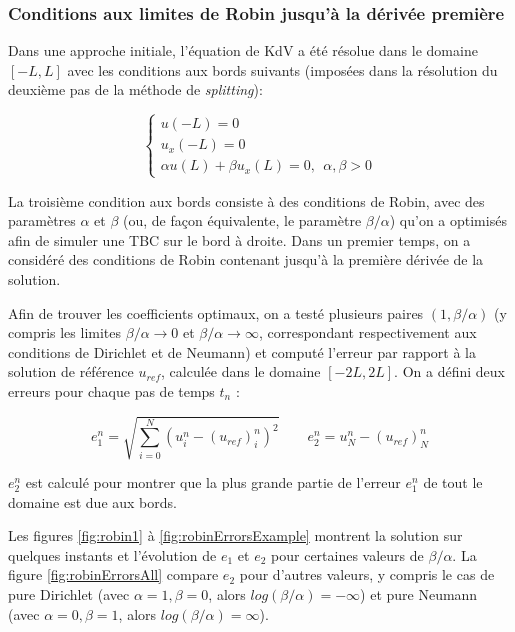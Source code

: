 \subsubsection{Conditions aux limites de Robin jusqu'à la dérivée première}

\indent Dans une approche initiale, l'équation de KdV a été résolue dans le domaine $[-L,L]$ avec les conditions aux bords suivants (imposées dans la résolution du deuxième pas de la méthode de \emph{splitting}):

\begin{equation*}
\begin{cases}
    u(-L) = 0 \\
    u_x(-L) = 0 \\
    \alpha u(L) + \beta u_x(L) = 0,  \ \ \alpha,\beta > 0
\end{cases}
\end{equation*}

\indent La troisième condition aux bords consiste à des conditions de Robin, avec des paramètres $\alpha$ et $\beta$ (ou, de façon équivalente, le paramètre  $\beta/\alpha$) qu'on a optimisés afin de simuler une TBC sur le bord à droite. Dans un premier temps, on a considéré des conditions de Robin contenant jusqu'à la première dérivée de la solution.

\indent Afin de trouver les coefficients optimaux, on a testé plusieurs paires $(1,\beta/\alpha)$ (y compris les limites $\beta/\alpha \rightarrow 0$ et $\beta/\alpha \rightarrow \infty$, correspondant respectivement aux conditions de Dirichlet et de Neumann) et computé l'erreur par rapport à la solution de référence $u_{ref}$, calculée dans le domaine $[-2L,2L]$. On a défini deux erreurs pour chaque pas de temps $t_n$ :

\begin{equation*}
e_1^n = \sqrt{\sum_{i=0}^N{\left( u^n_i - (u_{ref})^n_i\right)^2}} \qquad
e_2^n =  u^n_N - (u_{ref})^n_N
\end{equation*}

\indent $e_2^n$ est calculé pour montrer que la plus grande partie de l'erreur $e_1^n$ de tout le domaine est due aux bords.
 
\indent Les figures \ref{fig:robin1} à \ref{fig:robinErrorsExample} montrent la solution sur quelques instants et l'évolution de $e_1$ et $e_2$ pour certaines valeurs de $\beta/\alpha$. La figure \ref{fig:robinErrorsAll} compare $e_2$  pour d'autres valeurs, y compris le cas de pure Dirichlet  (avec $\alpha = 1, \beta = 0$, alors $log(\beta/\alpha) = -\infty$) et pure Neumann (avec $\alpha = 0, \beta = 1$, alors $log(\beta/\alpha) = \infty$).

